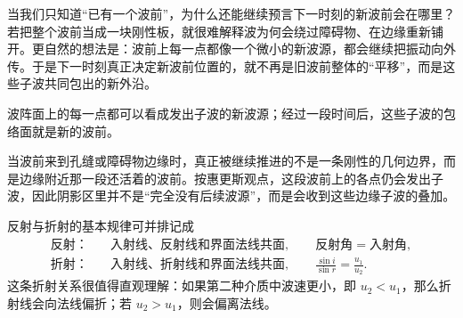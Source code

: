 当我们只知道“已有一个波前”，为什么还能继续预言下一时刻的新波前会在哪里？若把整个波前当成一块刚性板，就很难解释波为何会绕过障碍物、在边缘重新铺开。更自然的想法是：波前上每一点都像一个微小的新波源，都会继续把振动向外传。于是下一时刻真正决定新波前位置的，就不再是旧波前整体的“平移”，而是这些子波共同包出的新外沿。

\begin{theorem}[惠更斯原理]
波阵面上的每一点都可以看成发出子波的新波源；经过一段时间后，这些子波的包络面就是新的波前。
\end{theorem}

当波前来到孔缝或障碍物边缘时，真正被继续推进的不是一条刚性的几何边界，而是边缘附近那一段还活着的波前。按惠更斯观点，这段波前上的各点仍会发出子波，因此阴影区里并不是“完全没有后续波源”，而是会收到这些边缘子波的叠加。

\begin{theorem}[波的反射和折射]
反射与折射的基本规律可并排记成
\[
\begin{aligned}
\text{反射：}\quad &\text{入射线、反射线和界面法线共面},\qquad \text{反射角}=\text{入射角},\\
\text{折射：}\quad &\text{入射线、折射线和界面法线共面},\qquad \frac{\sin i}{\sin r}=\frac{u_1}{u_2}.
\end{aligned}
\]
这条折射关系很值得直观理解：如果第二种介质中波速更小，即 \(u_2<u_1\)，那么折射线会向法线偏折；若 \(u_2>u_1\)，则会偏离法线。
\end{theorem}
